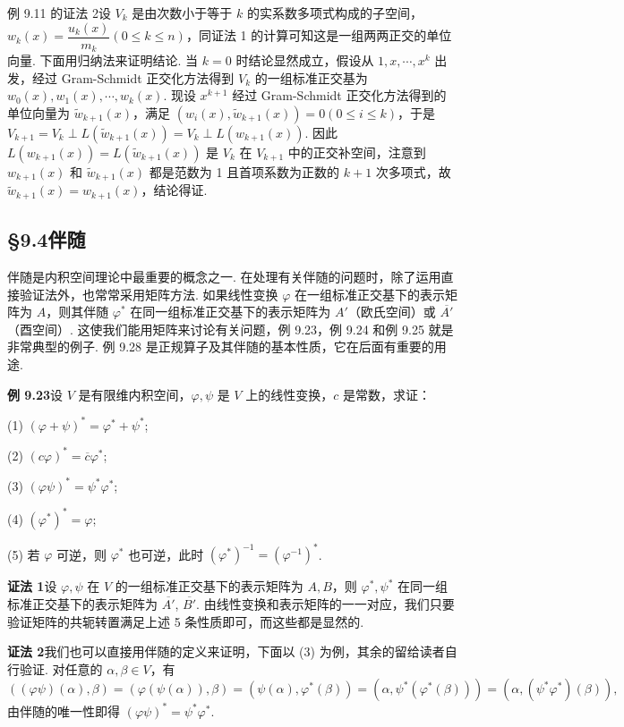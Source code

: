 \documentclass[UTF8,12pt,a4paper,fontset=fandol]{ctexart}
\begin{document}
例 9.11 的证法 2\quad 设 $V_k$ 是由次数小于等于 $k$ 的实系数多项式构成的子空间，$w_k(x)=\dfrac{u_k(x)}{m_k}(0\le k\le n)$，同证法 1 的计算可知这是一组两两正交的单位向量. 下面用归纳法来证明结论. 当 $k=0$ 时结论显然成立，假设从 $1,x,\cdots,x^k$ 出发，经过 Gram-Schmidt 正交化方法得到 $V_k$ 的一组标准正交基为 $w_0(x),w_1(x),\cdots,w_k(x)$. 现设 $x^{k+1}$ 经过 Gram-Schmidt 正交化方法得到的单位向量为 $\widetilde{w}_{k+1}(x)$，满足 $(w_i(x),\widetilde{w}_{k+1}(x))=0(0\le i\le k)$，于是 $V_{k+1}=V_k\perp L(\widetilde{w}_{k+1}(x))=V_k\perp L(w_{k+1}(x))$. 因此 $L(w_{k+1}(x))=L(\widetilde{w}_{k+1}(x))$ 是 $V_k$ 在 $V_{k+1}$ 中的正交补空间，注意到 $w_{k+1}(x)$ 和 $\widetilde{w}_{k+1}(x)$ 都是范数为 1 且首项系数为正数的 $k+1$ 次多项式，故 $\widetilde{w}_{k+1}(x)=w_{k+1}(x)$，结论得证.

\subsection*{§9.4\quad 伴随}

伴随是内积空间理论中最重要的概念之一. 在处理有关伴随的问题时，除了运用直接验证法外，也常常采用矩阵方法. 如果线性变换 $\varphi$ 在一组标准正交基下的表示矩阵为 $A$，则其伴随 $\varphi^*$ 在同一组标准正交基下的表示矩阵为 $A'$（欧氏空间）或 $\overline{A'}$（酉空间）. 这使我们能用矩阵来讨论有关问题，例 9.23，例 9.24 和例 9.25 就是非常典型的例子. 例 9.28 是正规算子及其伴随的基本性质，它在后面有重要的用途.

\noindent\textbf{例 9.23}\quad 设 $V$ 是有限维内积空间，$\varphi,\psi$ 是 $V$ 上的线性变换，$c$ 是常数，求证：

(1) $(\varphi+\psi)^*=\varphi^*+\psi^*$;

(2) $(c\varphi)^*=\overline{c}\varphi^*$;

(3) $(\varphi\psi)^*=\psi^*\varphi^*$;

(4) $(\varphi^*)^*=\varphi$;

(5) 若 $\varphi$ 可逆，则 $\varphi^*$ 也可逆，此时 $(\varphi^*)^{-1}=(\varphi^{-1})^*$.

\noindent\textbf{证法 1}\quad 设 $\varphi,\psi$ 在 $V$ 的一组标准正交基下的表示矩阵为 $A,B$，则 $\varphi^*,\psi^*$ 在同一组标准正交基下的表示矩阵为 $\overline{A'}$, $\overline{B'}$. 由线性变换和表示矩阵的一一对应，我们只要验证矩阵的共轭转置满足上述 5 条性质即可，而这些都是显然的.

\noindent\textbf{证法 2}\quad 我们也可以直接用伴随的定义来证明，下面以 (3) 为例，其余的留给读者自行验证. 对任意的 $\alpha,\beta\in V$，有
\[
((\varphi\psi)(\alpha),\beta)=(\varphi(\psi(\alpha)),\beta)
=(\psi(\alpha),\varphi^*(\beta))=(\alpha,\psi^*(\varphi^*(\beta)))
=(\alpha,(\psi^*\varphi^*)(\beta)),
\]
由伴随的唯一性即得 $(\varphi\psi)^*=\psi^*\varphi^*$.
\end{document}
